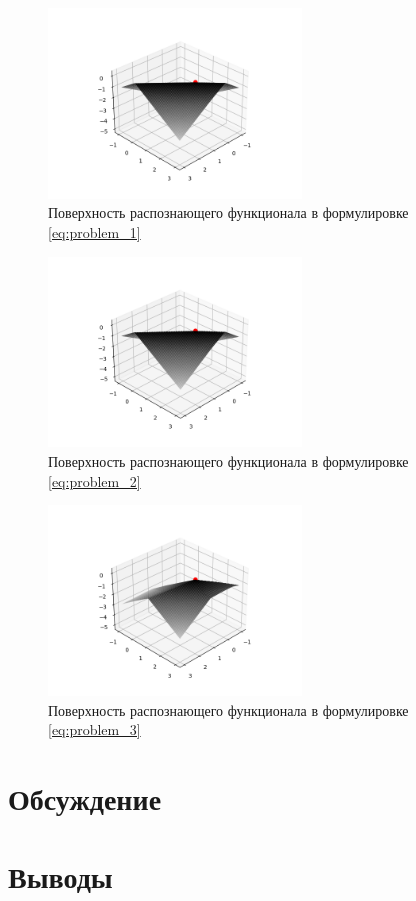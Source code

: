 \documentclass{article}
\begin{document}
  \begin{figure}[htbp!]
		\begin{center}
			\includegraphics[width = 0.6\textwidth]{tol_1_a_correction}
			\caption{Поверхность распознающего функционала в
        формулировке \ref{eq:problem_1}}
      \label{figure:tol_1}
		\end{center}
	\end{figure}

  \begin{figure}[htbp!]
		\begin{center}
			\includegraphics[width = 0.6\textwidth]{tol_2_a_correction}
			\caption{Поверхность распознающего функционала в
        формулировке \ref{eq:problem_2}}
      \label{figure:tol_1}
		\end{center}
	\end{figure}

  \begin{figure}[htbp!]
		\begin{center}
			\includegraphics[width = 0.6\textwidth]{tol_3_a_correction}
			\caption{Поверхность распознающего функционала в
        формулировке \ref{eq:problem_3}}
      \label{figure:tol_1}
		\end{center}
	\end{figure}

  \clearpage

  \section{Обсуждение}

  \section{Выводы}
\end{document}
